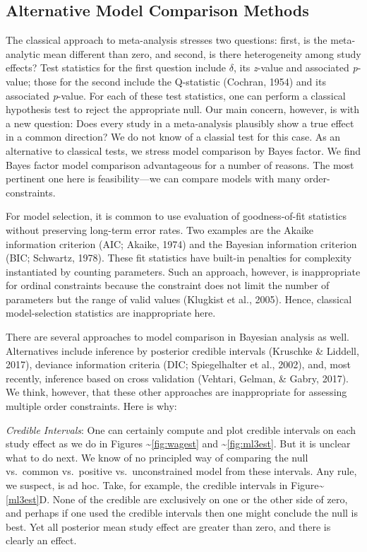 \documentclass[english,man]{apa6}
\theoremstyle{definition}
\theoremstyle{definition}
\theoremstyle{remark}
\begin{document}
\subsection{Alternative Model Comparison
Methods}\label{alternative-model-comparison-methods}

The classical approach to meta-analysis stresses two questions: first,
is the meta-analytic mean different than zero, and second, is there
heterogeneity among study effects? Test statistics for the first
question include \(\delta\), its \emph{z}-value and associated
\emph{p}-value; those for the second include the Q-statistic (Cochran,
1954) and its associated \emph{p}-value. For each of these test
statistics, one can perform a classical hypothesis test to reject the
appropriate null. Our main concern, however, is with a new question:
Does every study in a meta-analysis plausibly show a true effect in a
common direction? We do not know of a classial test for this case. As an
alternative to classical tests, we stress model comparison by Bayes
factor. We find Bayes factor model comparison advantageous for a number
of reasons. The most pertinent one here is feasibility---we can compare
models with many order-constraints.

For model selection, it is common to use evaluation of goodness-of-fit
statistics without preserving long-term error rates. Two examples are
the Akaike information criterion (AIC; Akaike, 1974) and the Bayesian
information criterion (BIC; Schwartz, 1978). These fit statistics have
built-in penalties for complexity instantiated by counting parameters.
Such an approach, however, is inappropriate for ordinal constraints
because the constraint does not limit the number of parameters but the
range of valid values (Klugkist et al., 2005). Hence, classical
model-selection statistics are inappropriate here.

There are several approaches to model comparison in Bayesian analysis as
well. Alternatives include inference by posterior credible intervals
(Kruschke \& Liddell, 2017), deviance information criteria (DIC;
Spiegelhalter et al., 2002), and, most recently, inference based on
cross validation (Vehtari, Gelman, \& Gabry, 2017). We think, however,
that these other approaches are inappropriate for assessing multiple
order constraints. Here is why:

\emph{Credible Intervals}: One can certainly compute and plot credible
intervals on each study effect as we do in Figures
\textasciitilde{}\ref{fig:wagest} and \textasciitilde{}\ref{fig:ml3est}.
But it is unclear what to do next. We know of no principled way of
comparing the null vs.~common vs.~positive vs.~unconstrained model from
these intervals. Any rule, we suspect, is ad hoc. Take, for example, the
credible intervals in Figure\textasciitilde{}\ref{ml3est}D. None of the
credible are exclusively on one or the other side of zero, and perhaps
if one used the credible intervals then one might conclude the null is
best. Yet all posterior mean study effect are greater than zero, and
there is clearly an effect.
\end{document}
